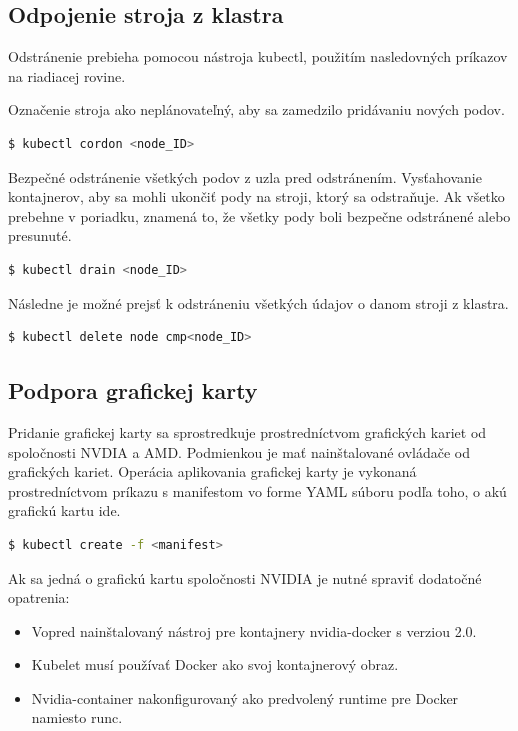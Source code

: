 \subsection{Odpojenie stroja z klastra}

Odstránenie prebieha pomocou nástroja kubectl, použitím nasledovných príkazov na riadiacej rovine.

Označenie stroja ako neplánovateľný, aby sa zamedzilo pridávaniu nových podov.

\begin{lstlisting}[language=Bash]
    $ kubectl cordon <node_ID>
    \end{lstlisting}

Bezpečné odstránenie všetkých podov z uzla pred odstránením. Vysťahovanie kontajnerov, aby sa mohli ukončiť pody na stroji, ktorý sa odstraňuje. Ak všetko prebehne v poriadku, znamená to, že všetky pody boli bezpečne odstránené alebo presunuté.

\begin{lstlisting}[language=Bash]
    $ kubectl drain <node_ID>
    \end{lstlisting}

Následne je možné prejsť k odstráneniu všetkých údajov o danom stroji z klastra.

\begin{lstlisting}[language=Bash]
    $ kubectl delete node cmp<node_ID>
    \end{lstlisting}

\subsection{Podpora grafickej karty}

Pridanie grafickej karty sa sprostredkuje prostredníctvom grafických kariet od spoločnosti NVDIA a AMD. Podmienkou je mať nainštalované ovládače od grafických kariet.
Operácia aplikovania grafickej karty je vykonaná prostredníctvom príkazu s manifestom vo forme YAML súboru podľa toho, o akú grafickú kartu ide.

\begin{lstlisting}[language=Bash]
    $ kubectl create -f <manifest>
    \end{lstlisting}

Ak sa jedná o grafickú kartu spoločnosti NVIDIA je nutné spraviť dodatočné opatrenia:

\begin{itemize}
    \item Vopred nainštalovaný nástroj pre kontajnery nvidia-docker s verziou 2.0.
    \item Kubelet musí používať Docker ako svoj kontajnerový obraz.
    \item Nvidia-container nakonfigurovaný ako predvolený runtime pre Docker namiesto runc.
\end{itemize}
